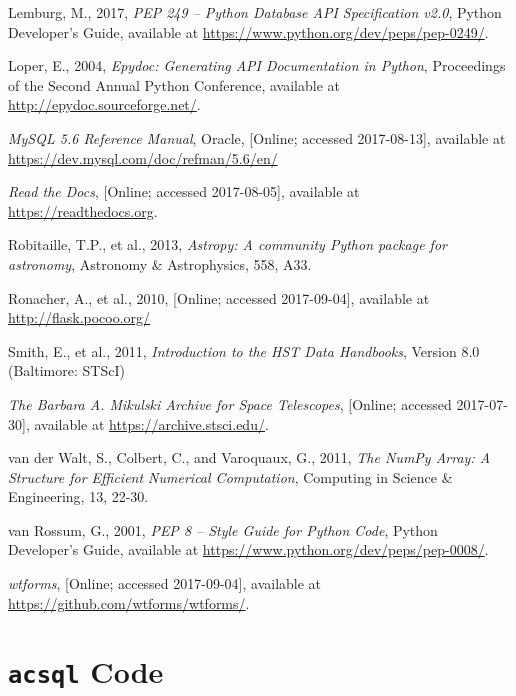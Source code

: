 \documentclass[10pt,journal,compsoc]{IEEEtran}
\begin{document}
\begin{thebibliography}{1}
Lemburg, M., 2017, \emph{PEP 249 -- Python Database API Specification v2.0}, Python Developer's Guide,
available at \url{https://www.python.org/dev/peps/pep-0249/}.

Loper, E., 2004, \emph{Epydoc: Generating API Documentation in Python}, Proceedings of the
Second Annual Python Conference, available at \url{http://epydoc.sourceforge.net/}.

\emph{MySQL 5.6 Reference Manual}, Oracle, [Online; accessed 2017-08-13], available at
\url{https://dev.mysql.com/doc/refman/5.6/en/}

\emph{Read the Docs}, [Online; accessed 2017-08-05], available at \url{https://readthedocs.org}.

Robitaille, T.P., et al., 2013, \emph{Astropy: A community Python package for astronomy},
Astronomy \& Astrophysics, 558, A33.

Ronacher, A., et al., 2010, [Online; accessed 2017-09-04], available at \url{http://flask.pocoo.org/}

Smith, E., et al., 2011, \emph{Introduction to the HST Data Handbooks}, Version 8.0 (Baltimore: STScI)

\emph{The Barbara A. Mikulski Archive for Space Telescopes}, [Online; accessed 2017-07-30],
available at \url{https://archive.stsci.edu/}.

van der Walt, S., Colbert, C., and Varoquaux, G., 2011, \emph{The NumPy Array: A Structure for
Efficient Numerical Computation}, Computing in Science \& Engineering, 13, 22-30.

van Rossum, G., 2001, \emph{PEP 8 -- Style Guide for Python Code}, Python Developer's Guide,
available at \url{https://www.python.org/dev/peps/pep-0008/}.

\emph{wtforms}, [Online; accessed 2017-09-04], available at \url{https://github.com/wtforms/wtforms/}.

\end{thebibliography}

\onecolumn
\newpage
\appendices
\section{\texttt{acsql} Code}
\end{document}
